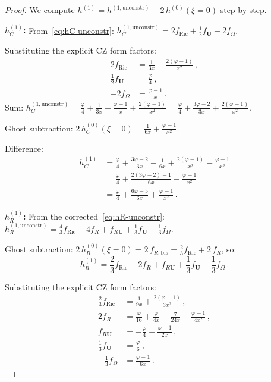 \documentclass[12pt,a4paper]{article}
\theoremstyle{definition}
\theoremstyle{remark}
\begin{document}
\begin{proof}
We compute $h^{(1)} = h^{(1,\mathrm{unconstr})} - 2\,h^{(0)}(\xi=0)$
step by step.

\noindent\textbf{$h_C^{(1)}$:}
From~\eqref{eq:hC-unconstr}: $h_C^{(1,\mathrm{unconstr})}
= 2f_{\mathrm{Ric}} + \frac{1}{2}f_{\mathbf{U}} - 2f_\Omega$.

Substituting the explicit CZ form factors:
\begin{align*}
  2f_{\mathrm{Ric}} &= \frac{1}{3x} + \frac{2(\varphi-1)}{x^2}\,,\\
  \frac{1}{2}f_{\mathbf{U}} &= \frac{\varphi}{4}\,,\\
  -2f_\Omega &= \frac{\varphi-1}{x}\,.
\end{align*}
Sum: $h_C^{(1,\mathrm{unconstr})}
= \frac{\varphi}{4} + \frac{1}{3x} + \frac{\varphi-1}{x}
+ \frac{2(\varphi-1)}{x^2}
= \frac{\varphi}{4} + \frac{3\varphi - 2}{3x}
+ \frac{2(\varphi-1)}{x^2}$.

Ghost subtraction:
$2\,h_C^{(0)}(\xi=0) = \frac{1}{6x} + \frac{\varphi-1}{x^2}$.

Difference:
\begin{align*}
  h_C^{(1)} &= \frac{\varphi}{4}
  + \frac{3\varphi-2}{3x} - \frac{1}{6x}
  + \frac{2(\varphi-1)}{x^2} - \frac{\varphi-1}{x^2}\\
  &= \frac{\varphi}{4}
  + \frac{2(3\varphi-2) - 1}{6x}
  + \frac{\varphi-1}{x^2}\\
  &= \frac{\varphi}{4}
  + \frac{6\varphi - 5}{6x}
  + \frac{\varphi-1}{x^2}\,.
\end{align*}

\noindent\textbf{$h_R^{(1)}$:}
From the corrected~\eqref{eq:hR-unconstr}:
$h_R^{(1,\mathrm{unconstr})}
= \frac{4}{3}f_{\mathrm{Ric}} + 4f_R + f_{R\mathbf{U}}
+ \frac{1}{3}f_{\mathbf{U}} - \frac{1}{3}f_\Omega$.

Ghost subtraction: $2\,h_R^{(0)}(\xi\!=\!0) = 2\,f_{R,\mathrm{bis}}
= \frac{2}{3}f_{\mathrm{Ric}} + 2\,f_R$, so:
\begin{equation*}
  h_R^{(1)} = \frac{2}{3}f_{\mathrm{Ric}} + 2f_R + f_{R\mathbf{U}}
  + \frac{1}{3}f_{\mathbf{U}} - \frac{1}{3}f_\Omega\,.
\end{equation*}

Substituting the explicit CZ form factors:
\begin{align*}
  \frac{2}{3}f_{\mathrm{Ric}}
  &= \frac{1}{9x} + \frac{2(\varphi-1)}{3x^2}\,,\\
  2f_R &= \frac{\varphi}{16} + \frac{\varphi}{4x}
    - \frac{7}{24x} - \frac{\varphi-1}{4x^2}\,,\\
  f_{R\mathbf{U}} &= -\frac{\varphi}{4}
    - \frac{\varphi-1}{2x}\,,\\
  \frac{1}{3}f_{\mathbf{U}} &= \frac{\varphi}{6}\,,\\
  -\frac{1}{3}f_\Omega &= \frac{\varphi-1}{6x}\,.
\end{align*}


\end{proof}
\end{document}
